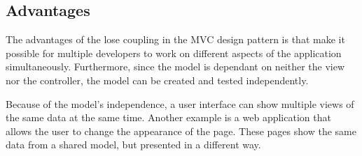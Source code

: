 \subsection{Advantages}


The advantages of the lose coupling in the MVC design pattern is that make it possible for 
multiple developers to work on different aspects of the application simultaneously. 
Furthermore, since the model is dependant on neither the view nor the controller, the model 
can be created and tested independently\cite{modelviewcontroller}.


Because of the model's independence, a user interface can show multiple views of the same 
data at the same time\cite{modelviewcontroller}. Another example is a web application that 
allows the user to change the appearance of the page. These pages show the same data from a 
shared model, but presented in a different way\cite{modelviewcontroller}. 